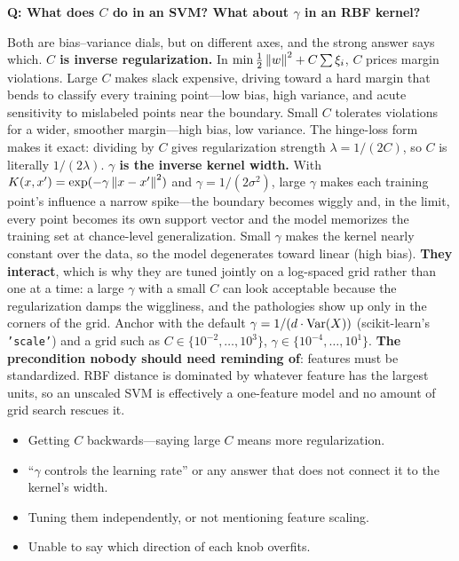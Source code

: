 \begin{interviewq}
\textbf{Q: What does $C$ do in an SVM? What about $\gamma$ in an RBF kernel?}

 \quad {} \quad \badgefreq{\freqmed}

\stronganswer

Both are bias--variance dials, but on different axes, and the strong answer says which. \textbf{$C$ is inverse regularization.} In $\min\tfrac12\left\lVert w\right\rVert^2 + C\sum\xi_i$, $C$ prices margin violations. Large $C$ makes slack expensive, driving toward a hard margin that bends to classify every training point---low bias, high variance, and acute sensitivity to mislabeled points near the boundary. Small $C$ tolerates violations for a wider, smoother margin---high bias, low variance. The hinge-loss form makes it exact: dividing by $C$ gives regularization strength $\lambda = 1/(2C)$, so $C$ is literally $1/(2\lambda)$. \textbf{$\gamma$ is the inverse kernel width.} With $K(x,x')=\exp(-\gamma\left\lVert x-x'\right\rVert^2)$ and $\gamma=1/(2\sigma^2)$, large $\gamma$ makes each training point's influence a narrow spike---the boundary becomes wiggly and, in the limit, every point becomes its own support vector and the model memorizes the training set at chance-level generalization. Small $\gamma$ makes the kernel nearly constant over the data, so the model degenerates toward linear (high bias). \textbf{They interact}, which is why they are tuned jointly on a log-spaced grid rather than one at a time: a large $\gamma$ with a small $C$ can look acceptable because the regularization damps the wiggliness, and the pathologies show up only in the corners of the grid. Anchor with the default $\gamma = 1/(d\cdot\operatorname{Var}(X))$ (scikit-learn's \texttt{'scale'}) and a grid such as $C\in\{10^{-2},\dots,10^{3}\}$, $\gamma\in\{10^{-4},\dots,10^{1}\}$. \textbf{The precondition nobody should need reminding of}: features must be standardized. RBF distance is dominated by whatever feature has the largest units, so an unscaled SVM is effectively a one-feature model and no amount of grid search rescues it.

\redflags
\begin{itemize}
    \item Getting $C$ backwards---saying large $C$ means more regularization.
    \item ``$\gamma$ controls the learning rate'' or any answer that does not connect it to the kernel's width.
    \item Tuning them independently, or not mentioning feature scaling.
    \item Unable to say which direction of each knob overfits.
\end{itemize}


\end{interviewq}
